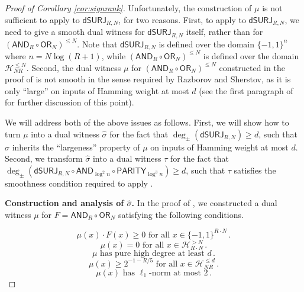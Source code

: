\documentclass{toc}
\newcommand{\dumSURJ}{\mathsf{dSURJ}}
\newcommand{\OR}{\mathsf{ OR}}
\newcommand{\bits}{\{-1,1\}}
\newcommand{\AND}{\mathsf{AND}}
\newcommand{\PARITY}{\mathsf{PARITY}}
\begin{document}
\begin{proof}[Proof of Corollary \ref{cor:signrank}]
Unfortunately, the construction of 
$\mu$ is not sufficient to apply  to $\dumSURJ_{R, N}$, for two reasons.
First, 
to apply  to $\dumSURJ_{R, N}$, we need to give a smooth dual witness for $\dumSURJ_{R, N}$ itself, rather than for $\left(\AND_R \circ \OR_N\right)^{\leq N}$. Note that
$\dumSURJ_{R, N}$ is defined over the domain $\bits^n$ where $n=N \log(R+1)$, while $\left(\AND_R \circ \OR_N\right)^{\leq N}$ is defined over the domain $\mathcal{H}_{NR}^{\leq N}$. Second, the dual witness $\mu$ for  $\left(\AND_R \circ \OR_N\right)^{\leq N}$ constructed in the proof of 
is not smooth in the sense required by Razborov and Sherstov, as it is only ``large'' on inputs of Hamming weight at most $d$ (see the first paragraph of 
for further discussion of this point). 


We will address both of the above issues as follows. First, we will show how to turn $\mu$ into a dual witness $\hat{\sigma}$
for the fact that $\deg_{\pm}\left(\dumSURJ_{R, N}\right)\geq d$, such that $\hat{\sigma}$ inherits the ``largeness'' property of $\mu$ on inputs of Hamming weight at most $d$. 
Second, we transform $\hat{\sigma}$ into a dual witness $\tau$ for the fact that $\deg_{\pm}\left(\dumSURJ_{R, N} \circ \AND_{\log^2 n} \circ \PARITY_{\log^3 n} \right)\geq d$, such
that $\tau$ satisfies the smoothness condition required to apply .

\medskip
\noindent \textbf{Construction and analysis of $\hat{\sigma}$.}
In the proof of , we constructed a dual witness $\mu$ for $F=\AND_R \circ \OR_N$ satisfying the following 
conditions.

\begin{equation} \label{asdf1}
\mu(x) \cdot F(x) \geq 0 \text{ for all } x \in \bits^{R \cdot N}\,.
\end{equation}
\begin{equation} \label{asdf2}
\mu(x) = 0  \text{ for all } x \in \mathcal{H}^{> N}_{R \cdot N}\,.
\end{equation}
\begin{equation} \label{asdf3}
\mu \text{ has pure high degree at least } d\,.
\end{equation}
\begin{equation} \label{nomorelabelsbrah}
\mu(x) \geq 2^{-1-R/5} \text{ for all } x \in \mathcal{H}_{NR}^{\leq d}\,.
\end{equation}
\begin{equation} \label{asdf4}
\mu(x) \text{ has } \ell_1\text{-norm at most } 2\,.
\end{equation}


\end{proof}
\end{document}
